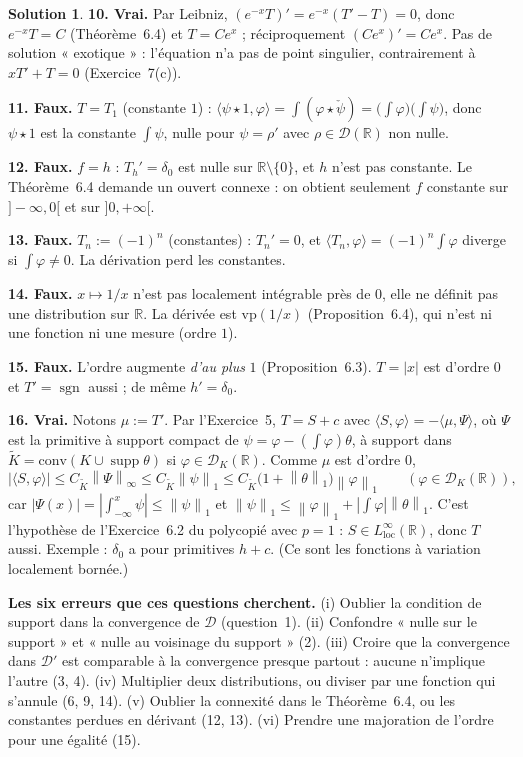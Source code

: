 \documentclass[11pt,a4paper]{article}
\newcommand{\R}{\mathbb{R}}
\newcommand{\norm}[1]{\left\|#1\right\|}
\DeclareMathOperator{\supp}{supp}
\DeclareMathOperator{\sgn}{sgn}
\newcommand{\D}{\mathcal{D}}
\theoremstyle{definition}
\newtheorem*{solution}{Solution}
\begin{document}
\begin{solution}
\medskip
\noindent\textbf{10. Vrai.} Par Leibniz, $(e^{-x}T)'=e^{-x}(T'-T)=0$, donc $e^{-x}T=C$ (Théorème~6.4) et $T=Ce^x$ ; réciproquement $(Ce^x)'=Ce^x$. Pas de solution « exotique » : l'équation n'a pas de point singulier, contrairement à $xT'+T=0$ (Exercice~7(c)).

\medskip
\noindent\textbf{11. Faux.} $T=T_1$ (constante $1$) : $\langle\psi\star1,\varphi\rangle=\int(\varphi\star\check\psi)=\big(\int\varphi\big)\big(\int\psi\big)$, donc $\psi\star1$ est la constante $\int\psi$, nulle pour $\psi=\rho'$ avec $\rho\in\D(\R)$ non nulle.

\medskip
\noindent\textbf{12. Faux.} $f=h$ : $T_h'=\delta_0$ est nulle sur $\R\setminus\{0\}$, et $h$ n'est pas constante. Le Théorème~6.4 demande un ouvert connexe : on obtient seulement $f$ constante sur $]-\infty,0[$ et sur $]0,+\infty[$.

\medskip
\noindent\textbf{13. Faux.} $T_n:=(-1)^n$ (constantes) : $T_n'=0$, et $\langle T_n,\varphi\rangle=(-1)^n\int\varphi$ diverge si $\int\varphi\ne0$. La dérivation perd les constantes.

\medskip
\noindent\textbf{14. Faux.} $x\mapsto1/x$ n'est pas localement intégrable près de $0$, elle ne définit pas une distribution sur $\R$. La dérivée est $\mathrm{vp}(1/x)$ (Proposition~6.4), qui n'est ni une fonction ni une mesure (ordre $1$).

\medskip
\noindent\textbf{15. Faux.} L'ordre augmente \emph{d'au plus} $1$ (Proposition~6.3). $T=|x|$ est d'ordre $0$ et $T'=\sgn$ aussi ; de même $h'=\delta_0$.

\medskip
\noindent\textbf{16. Vrai.} Notons $\mu:=T'$. Par l'Exercice~5, $T=S+c$ avec $\langle S,\varphi\rangle=-\langle\mu,\Psi\rangle$, où $\Psi$ est la primitive à support compact de $\psi=\varphi-(\int\varphi)\theta$, à support dans $\tilde K=\mathrm{conv}(K\cup\supp\theta)$ si $\varphi\in\D_K(\R)$. Comme $\mu$ est d'ordre $0$,
\[
|\langle S,\varphi\rangle|\le C_{\tilde K}\norm\Psi_\infty\le C_{\tilde K}\norm\psi_1\le C_{\tilde K}\big(1+\norm\theta_1\big)\norm\varphi_1\qquad(\varphi\in\D_K(\R)),
\]
car $|\Psi(x)|=|\int_{-\infty}^x\psi|\le\norm\psi_1$ et $\norm\psi_1\le\norm\varphi_1+|\int\varphi|\norm\theta_1$. C'est l'hypothèse de l'Exercice~6.2 du polycopié avec $p=1$ : $S\in L^\infty_{\mathrm{loc}}(\R)$, donc $T$ aussi. Exemple : $\delta_0$ a pour primitives $h+c$. (Ce sont les fonctions à variation localement bornée.)
\end{solution}

\begin{piege}
\textbf{Les six erreurs que ces questions cherchent.} (i) Oublier la condition de support dans la convergence de $\D$ (question~1). (ii) Confondre « nulle sur le support » et « nulle au voisinage du support » (2). (iii) Croire que la convergence dans $\D'$ est comparable à la convergence presque partout : aucune n'implique l'autre (3, 4). (iv) Multiplier deux distributions, ou diviser par une fonction qui s'annule (6, 9, 14). (v) Oublier la connexité dans le Théorème~6.4, ou les constantes perdues en dérivant (12, 13). (vi) Prendre une majoration de l'ordre pour une égalité (15).
\end{piege}
\end{document}

